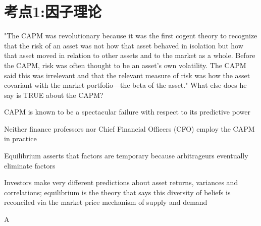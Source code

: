 \documentclass{article}
\newcounter{question} %
\begin{document}
 \tableofcontents %
\newpage




\section{考点1:因子理论}
\setcounter{question}{0}


\begin{question}
    "The CAPM was revolutionary because it was the first cogent theory to recognize that the risk of an asset was not how that asset behaved in isolation but how that asset moved in relation to other assets and to the market as a whole. Before the CAPM, risk was often thought to be an asset's own volatility. The CAPM said this was irrelevant and that the relevant measure of risk was how the asset covariant with the market portfolio—the beta of the asset." What else does he say is TRUE about the CAPM?
\end{question}

\begin{choices}
    \item CAPM is known to be a spectacular failure with respect to its predictive power
    \item Neither finance professors nor Chief Financial Officers (CFO) employ the CAPM in practice
    \item Equilibrium asserts that factors are temporary because arbitrageurs eventually eliminate factors
    \item Investors make very different predictions about asset returns, variances and correlations; equilibrium is the theory that says this diversity of beliefs is reconciled via the market price mechanism of supply and demand
\end{choices}

\begin{correctanswer}
    A
\end{correctanswer}
\end{document}
